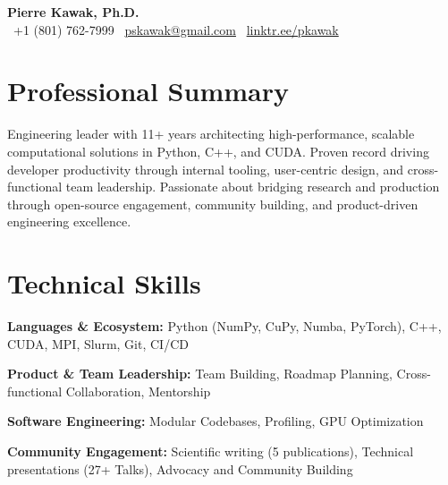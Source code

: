 \begin{center}
  {\LARGE \textbf{Pierre Kawak, Ph.D.}}\\
  \faPhone\ +1 (801) 762-7999 \quad \faEnvelope\ \href{mailto:pskawak@gmail.com}{pskawak@gmail.com} \quad \faLink\ \href{https://linktr.ee/pkawak}{linktr.ee/pkawak}
\end{center}
\vspace{-0.3\baselineskip}
\section*{Professional Summary}
Engineering leader with 11+ years architecting high-performance, scalable computational solutions in Python, C++, and CUDA.
Proven record driving developer productivity through internal tooling, user-centric design, and cross-functional team leadership.
Passionate about bridging research and production through open-source engagement, community building, and product-driven engineering excellence.
\vspace{-0.3\baselineskip}
\section*{Technical Skills}
\begin{tabitemize}[leftmargin=*]
  \item \textbf{Languages \& Ecosystem:} Python (NumPy, CuPy, Numba, PyTorch), C++, CUDA, MPI, Slurm, Git, CI/CD
  \item \textbf{Product \& Team Leadership:} Team Building, Roadmap Planning, Cross-functional Collaboration, Mentorship
  \item \textbf{Software Engineering:} Modular Codebases, Profiling, GPU Optimization
  \item \textbf{Community Engagement:} Scientific writing (5 publications), Technical presentations (27+ Talks), Advocacy and Community Building
\end{tabitemize}
\vspace{-0.3\baselineskip}
